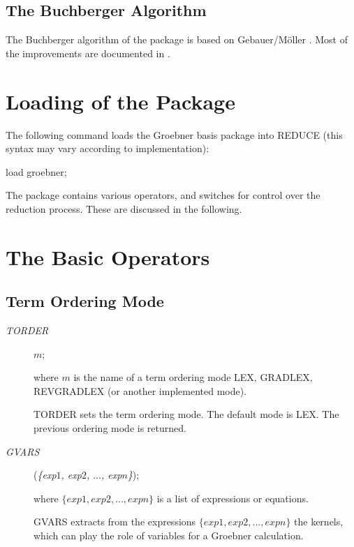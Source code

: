 \subsection{The Buchberger Algorithm}
The Buchberger algorithm of the package is based on {\sc
Gebauer/M\"oller} \cite{GEMO88}. Most of the
improvements are documented in \cite{MEMON88}.

\section{Loading of the Package}
The following command loads the Groebner basis package into
REDUCE (this syntax may vary according to implementation):
\begin{center}
load groebner;
\end{center}

The package contains various operators, and switches for control
over the reduction process. These are discussed in the following.

\section{The Basic Operators}

\subsection{Term Ordering Mode}
\begin{description}
\item [{\it TORDER}] $m$;

where $m$ is the name of a term ordering mode LEX, GRADLEX,
REV\-GRAD\-LEX (or another implemented mode).

TORDER sets the term ordering mode.  The default mode is LEX. The
previous ordering mode is returned.

\item[{\it GVARS}] ({\it\{exp$1$, exp$2$, $ \ldots$, exp$n$\}});

 where $\{exp1, exp2, \ldots , expn\}$ is a list of expressions or
equations.

GVARS extracts from the expressions $\{exp1, exp2, \ldots , expn\}$
the kernels, which can play the role of variables for a Groebner
calculation. \end{description}

